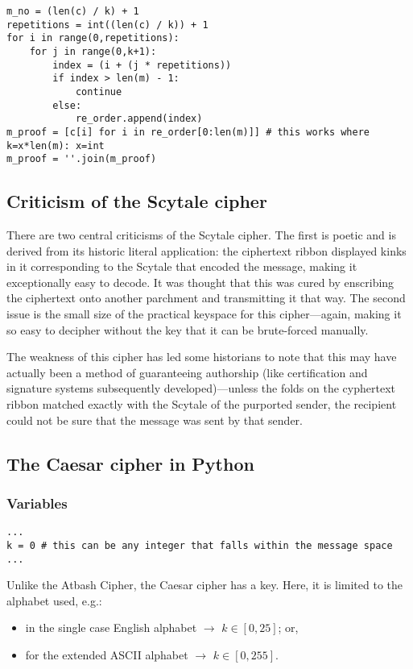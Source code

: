 \documentclass{AIAA}
\begin{document}
\begin{verbatim}
m_no = (len(c) / k) + 1
repetitions = int((len(c) / k)) + 1
for i in range(0,repetitions):
    for j in range(0,k+1):
        index = (i + (j * repetitions))
        if index > len(m) - 1:
            continue
        else:
            re_order.append(index)
m_proof = [c[i] for i in re_order[0:len(m)]] # this works where k=x*len(m): x=int
m_proof = ''.join(m_proof)
\end{verbatim}

\subsection{Criticism of the Scytale cipher}

There are two central criticisms of the Scytale cipher. The first is poetic and is derived from its historic literal application: the ciphertext ribbon displayed kinks in it corresponding to the Scytale that encoded the message, making it exceptionally easy to decode. It was thought that this was cured by enscribing the ciphertext onto another parchment and transmitting it that way.  The second issue is the small size of the practical keyspace for this cipher---again, making it so easy to decipher without the key that it can be brute-forced manually.

The weakness of this cipher has led some historians to note that this may have actually been a method of guaranteeing authorship (like certification and signature systems subsequently developed)---unless the folds on the cyphertext ribbon matched exactly with the Scytale of the purported sender, the recipient could not be sure that the message was sent by that sender.

\subsection{The Caesar cipher in Python}

\subsubsection{Variables}
\begin{verbatim}
...
k = 0 # this can be any integer that falls within the message space
...
\end{verbatim}
Unlike the Atbash Cipher, the Caesar cipher has a key. Here, it is limited to the alphabet used, e.g.:
\begin{itemize}
	\item in the single case English alphabet $\longrightarrow$ $k \in [0,25]$; or,
	\item for the extended ASCII alphabet $\longrightarrow$ $k \in [0,255]$.
\end{itemize}
\end{document}
